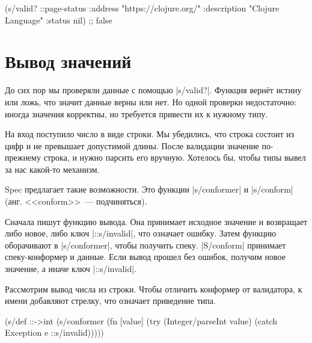 \begin{english}
  \begin{clojure}
(s/valid? ::page-status
          {:address "https://clojure.org/"
           :description "Clojure Language"
           :status nil})
;; false
  \end{clojure}
\end{english}

\section{Вывод значений}

\label{spec-conform}


До сих пор мы проверяли данные с помощью \spverb|s/valid?|. Функция верн\"{е}т
истину или ложь, что значит данные верны или нет. Но одной проверки
недостаточно: иногда значения корректны, но требуется привести их к нужному
типу.

На вход поступило число в виде строки. Мы убедились, что строка состоит из цифр
и не превышает допустимой длины. После валидации значение по-прежнему строка, и
нужно парсить его вручную. Хотелось бы, чтобы типы вывел за нас какой-то
механизм.


Spec предлагает такие возможности. Это функции \spverb|s/conformer| и
\spverb|s/conform| (анг. <<conform>>~--- подчиняться).

\label{spec-invalid}



Сначала пишут функцию вывода. Она принимает исходное значение и возвращает либо
новое, либо ключ \spverb|::s/invalid|, что означает ошибку. Затем функцию
оборачивают в \spverb|s/conformer|, чтобы получить спеку. \spverb|S/conform|
принимает спеку-конформер и данные. Если вывод прошел без ошибок, получим новое
значение, а иначе ключ \spverb|::s/invalid|.

Рассмотрим вывод числа из строки. Чтобы отличить конформер от валидатора, к
имени добавляют стрелку, что означает приведение типа.

\begin{english}
  \begin{clojure}
(s/def ::->int
  (s/conformer
   (fn [value]
     (try
       (Integer/parseInt value)
       (catch Exception e
         ::s/invalid)))))
  \end{clojure}
\end{english}

